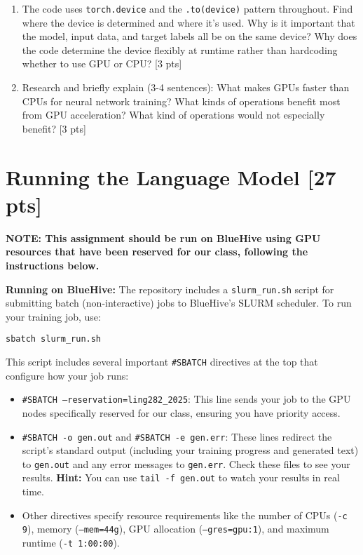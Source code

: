 \documentclass[11pt]{article}
\begin{document}
\vspace{2em}
\begin{enumerate}[label=\alph*., itemsep=2em]
  \item The code uses \texttt{torch.device} and the \texttt{.to(device)} pattern throughout. Find where the device is determined and where it's used. Why is it important that the model, input data, and target labels all be on the same device? Why does the code determine the device flexibly at runtime rather than hardcoding whether to use GPU or CPU? [3 pts]
  \item Research and briefly explain (3-4 sentences): What makes GPUs faster than CPUs for neural network training? What kinds of operations benefit most from GPU acceleration? What kind of operations would not especially benefit? [3 pts]
\end{enumerate}

\newpage
\section{Running the Language Model [27 pts]}

\textbf{NOTE: This assignment should be run on BlueHive using GPU resources that have been reserved for our class, following the instructions below.}

\vspace{1em}
\noindent \textbf{Running on BlueHive:} The repository includes a \texttt{slurm\_run.sh} script for submitting batch (non-interactive) jobs to BlueHive's SLURM scheduler. To run your training job, use:
\begin{verbatim}
sbatch slurm_run.sh
\end{verbatim}

\noindent This script includes several important \texttt{\#SBATCH} directives at the top that configure how your job runs:
\begin{itemize}
  \item \texttt{\#SBATCH --reservation=ling282\_2025}: This line sends your job to the GPU nodes specifically reserved for our class, ensuring you have priority access.
  \item \texttt{\#SBATCH -o gen.out} and \texttt{\#SBATCH -e gen.err}: These lines redirect the script's standard output (including your training progress and generated text) to \texttt{gen.out} and any error messages to \texttt{gen.err}. Check these files to see your results. \textbf{Hint:} You can use \texttt{tail -f gen.out} to watch your results in real time.
  \item Other directives specify resource requirements like the number of CPUs (\texttt{-c 9}), memory (\texttt{--mem=44g}), GPU allocation (\texttt{--gres=gpu:1}), and maximum runtime (\texttt{-t 1:00:00}).
\end{itemize}
\end{document}
